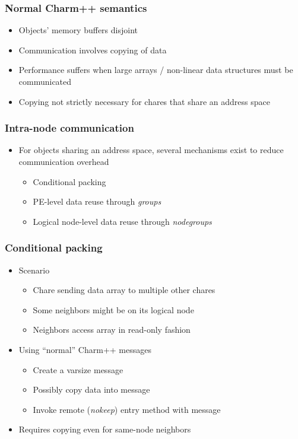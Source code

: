 
\begin{frame}[fragile]
  \frametitle{Normal Charm++ semantics}
  \begin{itemize}
    \item Objects' memory buffers disjoint
    \item Communication involves copying of data
    \item Performance suffers when large arrays / non-linear data structures must be communicated
    \item Copying not strictly necessary for chares that share an address space
  \end{itemize}
\end{frame}

\begin{frame}[fragile]
  \frametitle{Intra-node communication}
  \begin{itemize}
    \item For objects sharing an address space, several mechanisms exist to reduce communication overhead
    \begin{itemize}
      \item Conditional packing
      \item PE-level data reuse through {\em groups}
      \item Logical node-level data reuse through {\em nodegroups}
    \end{itemize}
  \end{itemize}
\end{frame}

\begin{frame}[fragile]
  \frametitle{Conditional packing}
  \begin{itemize}
  \item Scenario
    \begin{itemize}
      \item Chare sending data array to multiple other chares
      \item Some neighbors might be on its logical node
      \item Neighbors access array in read-only fashion
    \end{itemize}
  \item Using ``normal'' Charm++ messages
    \begin{itemize}
      \item Create a varsize message
      \item Possibly copy data into message
      \item Invoke remote ({\em nokeep}) entry method with message
    \end{itemize}
  \item Requires copying even for same-node neighbors
  \end{itemize}
\end{frame}


